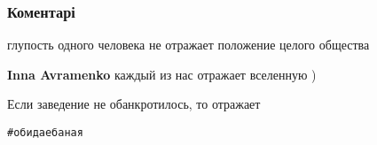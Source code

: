  
 
 
 
 
\subsubsection{Коментарі}

\begin{itemize}
 
глупость одного человека не отражает положение целого общества
\begin{itemize}
 
\textbf{Inna Avramenko} каждый из нас отражает вселенную )

 
Если заведение не обанкротилось, то отражает
\end{itemize}

 
\verb|#обидаебаная|

 

\end{itemize}
